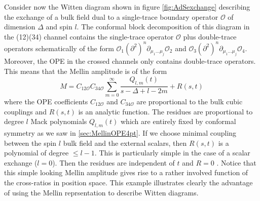 \documentclass{ws-rv9x6}
\newcommand\be{\begin{equation}}
\newcommand\ee{\end{equation}}
\newcommand\D{\Delta}
\newcommand\Op{\mathcal{O}}
\begin{document}
Consider now the Witten diagram shown in figure \ref{fig:AdSexchange} describing the exchange of a bulk field dual to a single-trace boundary operator $\Op$ of dimension $\Delta$ and spin $l$.
The conformal block decomposition of this diagram in the (12)(34) channel contains the single-trace operator  $\Op$  plus  double-trace operators schematically of the form $\Op_1 (\partial^{2})^n\partial_{\mu_1\dots \mu_j}\Op_2$ and $\Op_3 (\partial^{2})^n\partial_{\mu_1\dots \mu_j}\Op_4$. Moreover, the OPE in the crossed channels only contains double-trace operators.
This means that the Mellin amplitude is of the form
\be
M=C_{12\Op}C_{34\Op} \sum_{m=0}^\infty \frac{Q_{l,m}(t)}{s-\D+l-2m} + R(s,t)
\ee
where the OPE coefficients $C_{12\Op}$ and $C_{34\Op}$ are proportional to the bulk cubic couplings and $R(s,t)$ is an analytic function. 
The residues are proportional to degree $l$ Mack polynomials $Q_{l,m}(t)$ which are entirely fixed by conformal symmetry as we saw in \ref{sec:MellinOPE4pt}.
If we choose minimal coupling between the spin $l$ bulk field and the external scalars, then $R(s,t)$ is a polynomial of degree $\le l-1$.
This is particularly simple in the case of a scalar exchange ($l=0$). Then the residues are independent of $t$ and $R=0$ \cite{arXiv:1011.1485}.
Notice that this simple looking Mellin amplitude gives rise to a rather involved function of the cross-ratios in position space. This example  illustrates clearly the advantage of using the Mellin reprsentation to describe Witten diagrams.
\end{document}
